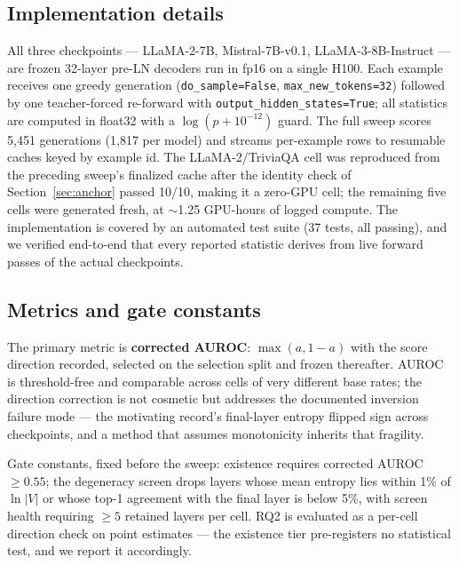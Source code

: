 \subsection{Implementation details}
\label{sec:implementation}

All three checkpoints --- LLaMA-2-7B, Mistral-7B-v0.1, LLaMA-3-8B-Instruct --- are frozen 32-layer pre-LN decoders run in fp16 on a single H100. Each example receives one greedy generation (\texttt{do\_sample=False}, \texttt{max\_new\_tokens=32}) followed by one teacher-forced re-forward with \texttt{output\_hidden\_states=True}; all statistics are computed in float32 with a $\log(p + 10^{-12})$ guard. The full sweep scores 5,451 generations (1,817 per model) and streams per-example rows to resumable caches keyed by example id. The LLaMA-2/TriviaQA cell was reproduced from the preceding sweep's finalized cache after the identity check of Section~\ref{sec:anchor} passed 10/10, making it a zero-GPU cell; the remaining five cells were generated fresh, at $\sim$1.25 GPU-hours of logged compute. The implementation is covered by an automated test suite (37 tests, all passing), and we verified end-to-end that every reported statistic derives from live forward passes of the actual checkpoints.

\subsection{Metrics and gate constants}
\label{sec:metrics}

The primary metric is \textbf{corrected AUROC}: $\max(a, 1-a)$ with the score direction recorded, selected on the selection split and frozen thereafter. AUROC is threshold-free and comparable across cells of very different base rates; the direction correction is not cosmetic but addresses the documented inversion failure mode --- the motivating record's final-layer entropy flipped sign across checkpoints, and a method that assumes monotonicity inherits that fragility.

Gate constants, fixed before the sweep: existence requires corrected AUROC $\geq 0.55$; the degeneracy screen drops layers whose mean entropy lies within 1\% of $\ln|V|$ or whose top-1 agreement with the final layer is below 5\%, with screen health requiring $\geq 5$ retained layers per cell. RQ2 is evaluated as a per-cell direction check on point estimates --- the existence tier pre-registers no statistical test, and we report it accordingly.
